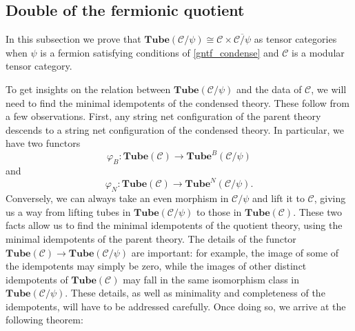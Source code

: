 \documentclass[12pt,a4paper]{article}
\newcounter{arrow}
\newcommand{\mcc}{\mathcal{C}}
\newcommand\be            {\begin{equation}}
\newcommand\ee            {\end{equation}}
\newcommand{\tube}{\textbf{Tube}}
\newcommand{\kw}[1]{{\color{kwcolor}\footnotesize{(KW) #1}}}
\newcommand{\dave}[1]{{\color{ao(english)}\footnotesize{(DA) #1}}}
\begin{document}
\subsection{Double of the fermionic quotient}
\label{double_fermionic_quotient}

In this subsection we prove that $\tube(\mcc/\psi) \cong \mcc \times \overline{\mcc/\psi}$ as tensor categories
when $\psi$ is a fermion satisfying conditions of \ref{gntf_condense} and $\mcc$ is a modular tensor category.

To get insights on the relation between $\tube(\mcc/\psi)$ and the data of $\mcc$, we will need to find the minimal idempotents of the condensed theory.
These follow from a few observations. 
First, any string net configuration of the parent theory descends to a string net configuration of the condensed theory.
In particular, we have two functors
\be
	\varphi_B : \tube(\mcc) \rightarrow \tube^B(\mcc/\psi)
\ee
and
\be
	\varphi_N : \tube(\mcc) \rightarrow \tube^N(\mcc/\psi) .
\ee
Conversely, we can always take an even morphism in $\mcc/\psi$ and lift it to $\mcc$, giving 
us a way from lifting tubes in $\tube(\mcc/\psi)$ to those in $\tube(\mcc)$.
These two facts allow us to find the minimal idempotents of the quotient theory, 
using the minimal idempotents of the parent theory.
The details of the functor $\tube(\mcc) \rightarrow \tube(\mcc/\psi)$ are important:
for example, the image of some of the idempotents may simply be zero, 
while the images of other distinct idempotents of $\tube(\mcc)$ may fall in the same isomorphism class in $\tube(\mcc/\psi)$. 
These details, as well as minimality and completeness of the idempotents, will have to be addressed carefully.
Once doing so, we arrive at the following theorem:
\end{document}
